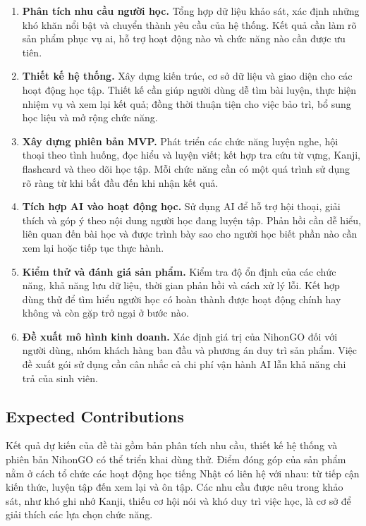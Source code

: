 \begin{enumerate}[leftmargin=*, itemsep=4pt]
  \item \textbf{Phân tích nhu cầu người học.} Tổng hợp dữ liệu khảo sát, xác định những khó khăn nổi bật và chuyển thành yêu cầu của hệ thống. Kết quả cần làm rõ sản phẩm phục vụ ai, hỗ trợ hoạt động nào và chức năng nào cần được ưu tiên.
  \item \textbf{Thiết kế hệ thống.} Xây dựng kiến trúc, cơ sở dữ liệu và giao diện cho các hoạt động học tập. Thiết kế cần giúp người dùng dễ tìm bài luyện, thực hiện nhiệm vụ và xem lại kết quả; đồng thời thuận tiện cho việc bảo trì, bổ sung học liệu và mở rộng chức năng.
  \item \textbf{Xây dựng phiên bản MVP.} Phát triển các chức năng luyện nghe, hội thoại theo tình huống, đọc hiểu và luyện viết; kết hợp tra cứu từ vựng, Kanji, flashcard và theo dõi học tập. Mỗi chức năng cần có một quá trình sử dụng rõ ràng từ khi bắt đầu đến khi nhận kết quả.
  \item \textbf{Tích hợp AI vào hoạt động học.} Sử dụng AI để hỗ trợ hội thoại, giải thích và góp ý theo nội dung người học đang luyện tập. Phản hồi cần dễ hiểu, liên quan đến bài học và được trình bày sao cho người học biết phần nào cần xem lại hoặc tiếp tục thực hành.
  \item \textbf{Kiểm thử và đánh giá sản phẩm.} Kiểm tra độ ổn định của các chức năng, khả năng lưu dữ liệu, thời gian phản hồi và cách xử lý lỗi. Kết hợp dùng thử để tìm hiểu người học có hoàn thành được hoạt động chính hay không và còn gặp trở ngại ở bước nào.
  \item \textbf{Đề xuất mô hình kinh doanh.} Xác định giá trị của NihonGO đối với người dùng, nhóm khách hàng ban đầu và phương án duy trì sản phẩm. Việc đề xuất gói sử dụng cần cân nhắc cả chi phí vận hành AI lẫn khả năng chi trả của sinh viên.
\end{enumerate}

\subsection{Expected Contributions}

Kết quả dự kiến của đề tài gồm bản phân tích nhu cầu, thiết kế hệ thống và phiên bản NihonGO có thể triển khai dùng thử. Điểm đóng góp của sản phẩm nằm ở cách tổ chức các hoạt động học tiếng Nhật có liên hệ với nhau: từ tiếp cận kiến thức, luyện tập đến xem lại và ôn tập. Các nhu cầu được nêu trong khảo sát, như khó ghi nhớ Kanji, thiếu cơ hội nói và khó duy trì việc học, là cơ sở để giải thích các lựa chọn chức năng.

